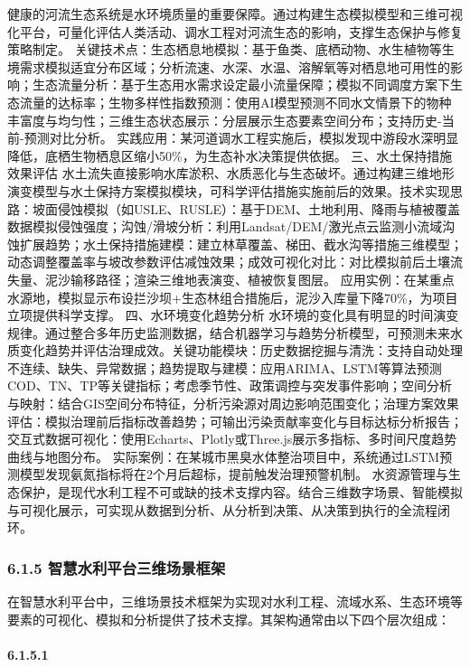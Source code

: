 {健康的河流生态系统是水环境质量的重要保障。通过构建生态模拟模型和三维可视化平台，可量化评估人类活动、调水工程对河流生态的影响，支撑生态保护与修复策略制定。
关键技术点：生态栖息地模拟：基于鱼类、底栖动物、水生植物等生境需求模拟适宜分布区域；分析流速、水深、水温、溶解氧等对栖息地可用性的影响；生态流量分析：基于生态用水需求设定最小流量保障；模拟不同调度方案下生态流量的达标率；生物多样性指数预测：使用AI模型预测不同水文情景下的物种丰富度与均匀性；三维生态状态展示：分层展示生态要素空间分布；支持历史-当前-预测对比分析。
实践应用：某河道调水工程实施后，模拟发现中游段水深明显降低，底栖生物栖息区缩小50\%，为生态补水决策提供依据。 三、水土保持措施效果评估
水土流失直接影响水库淤积、水质恶化与生态破坏。通过构建三维地形演变模型与水土保持方案模拟模块，可科学评估措施实施前后的效果。技术实现思路：坡面侵蚀模拟（如USLE、RUSLE）：基于DEM、土地利用、降雨与植被覆盖数据模拟侵蚀强度；沟蚀/滑坡分析：利用Landsat/DEM/激光点云监测小流域沟蚀扩展趋势；水土保持措施建模：建立林草覆盖、梯田、截水沟等措施三维模型；动态调整覆盖率与坡改参数评估减蚀效果；成效可视化对比：对比模拟前后土壤流失量、泥沙输移路径；渲染三维地表演变、植被恢复图层。
应用实例：在某重点水源地，模拟显示布设拦沙坝+生态林组合措施后，泥沙入库量下降70\%，为项目立项提供科学支撑。 四、水环境变化趋势分析
水环境的变化具有明显的时间演变规律。通过整合多年历史监测数据，结合机器学习与趋势分析模型，可预测未来水质变化趋势并评估治理成效。关键功能模块：历史数据挖掘与清洗：支持自动处理不连续、缺失、异常数据；趋势提取与建模：应用ARIMA、LSTM等算法预测COD、TN、TP等关键指标；考虑季节性、政策调控与突发事件影响；空间分析与映射：结合GIS空间分布特征，分析污染源对周边影响范围变化；治理方案效果评估：模拟治理前后指标改善趋势；可输出污染贡献率变化与目标达标分析报告；交互式数据可视化：使用Echarts、Plotly或Three.js展示多指标、多时间尺度趋势曲线与地图分布。
实际案例：在某城市黑臭水体整治项目中，系统通过LSTM预测模型发现氨氮指标将在2个月后超标，提前触发治理预警机制。
水资源管理与生态保护，是现代水利工程不可或缺的技术支撑内容。结合三维数字场景、智能模拟与可视化展示，可实现从数据到分析、从分析到决策、从决策到执行的全流程闭环。 \subsubsection{6.1.5
智慧水利平台三维场景框架}\label{ux667aux6167ux6c34ux5229ux5e73ux53f0ux4e09ux7ef4ux573aux666fux6846ux67b6}
在智慧水利平台中，三维场景技术框架为实现对水利工程、流域水系、生态环境等要素的可视化、模拟和分析提供了技术支撑。其架构通常由以下四个层次组成： \paragraph{6.1.5.1
}}
